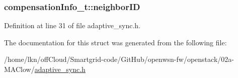 \subsubsection[{\texorpdfstring{neighbor\+ID}{neighborID}}]{ compensation\+Info\+\_\+t\+::neighbor\+ID}\hypertarget{structcompensation_info__t_a1eb136216bfe65b6708aec6953ca21a3}{}\label{structcompensation_info__t_a1eb136216bfe65b6708aec6953ca21a3}


Definition at line 31 of file adaptive\+\_\+sync.\+h.



The documentation for this struct was generated from the following file\+:\begin{DoxyCompactItemize}
\item 
/home/lkn/off\+Cloud/\+Smartgrid-\/code/\+Git\+Hub/openwsn-\/fw/openstack/02a-\/\+M\+A\+Clow/\hyperlink{adaptive__sync_8h}{adaptive\+\_\+sync.\+h}\end{DoxyCompactItemize}
